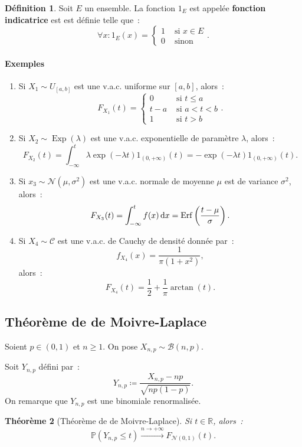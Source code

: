 \documentclass{article}
\renewcommand{\P}{\mathbb P}
\newcommand{\R}{\mathbb R}
\newcommand{\Nms}{\mathcal N(\mu, \sigma^2)}
\newcommand{\Nzu}{\mathcal N(0, 1)}
\DeclareMathOperator{\Erf}{Erf}
\DeclareMathOperator{\Exp}{Exp}
\newtheorem{thm}{Théorème}[section]
\theoremstyle{definition}
\newtheorem{déf}[thm]{Définition}
\theoremstyle{remark}
\begin{document}
		\begin{déf} Soit $E$ un ensemble. La fonction $1_E$ est appelée \textbf{fonction indicatrice} est est définie telle que~:
		\[\forall x : 1_E(x) = \begin{cases}1 &\text{ si }x \in E \\0 &\text{ sinon}\end{cases}.\]
		\end{déf}

		\paragraph{Exemples}

		\begin{enumerate}
			\item Si $X_1 \sim U_{[a, b]}$ est une v.a.c. uniforme sur $[a, b]$, alors~:
			      \[F_{X_1}(t) = \begin{cases}0 &\text{ si }t \leq a \\t-a &\text{ si }a < t < b \\1 &\text{ si }t > b\end{cases}.\]

			\item Si $X_2 \sim \Exp(\lambda)$ est une v.a.c. exponentielle de paramètre $\lambda$, alors~:
			      \[F_{X_2}(t) = \int_{-\infty}^t\lambda\exp(-\lambda t)1_{(0, +\infty)}(t) = -\exp(-\lambda t)1_{(0, +\infty)}(t).\]

			\item Si $x_3 \sim \Nms$ est une v.a.c. normale de moyenne $\mu$ est de variance $\sigma^2$, alors~:
			      \[F_{X_3}(t) = \int_{-\infty}^tf(x)\dif x = \Erf\left(\frac {t-\mu}\sigma\right).\]

			\item Si $X_4 \sim \mathcal C$ est une v.a.c. de Cauchy de densité donnée par~:
			      \[f_{X_4}(x) = \frac 1{\pi(1+x^2)},\]
				  alors~:
				  \[F_{X_4}(t) = \frac 12 + \frac 1\pi\arctan(t).\]
		\end{enumerate}
	
	\subsection{Théorème de de Moivre-Laplace}
		Soient $p \in (0, 1)$ et $n \geq 1$. On pose $X_{n, p} \sim \mathcal B(n, p)$.

		Soit $Y_{n, p}$ défini par~: \[Y_{n, p} \coloneqq \frac {X_{n, p} - np}{\sqrt{np(1-p)}}.\]
		On remarque que $Y_{n, p}$ est une binomiale renormalisée.

		\begin{thm}[Théorème de de Moivre-Laplace] Si $t \in \R$, alors~:
		\[\P(Y_{n, p} \leq t) \stackrel{n \to +\infty}{\to}F_{\Nzu}(t).\]
		\end{thm}
\end{document}
